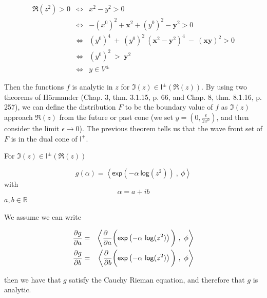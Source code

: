 \documentclass[10pt]{book}
\theoremstyle{break}
\begin{document}
\begin{eqnarray*}
\Re(z^2) > 0 &\Longleftrightarrow& x^2 - y^2 > 0 \\
&\Longleftrightarrow& -(x^0)^2 + \mathbf{x}^2 + (y^0)^2 - \mathbf{y}^2 > 0 \nonumber \\
&\Longleftrightarrow& (y^0)^4 \ + \ (y^0)^2 \ (\mathbf{x}^2-\mathbf{y}^2)^4 \ - \ \left(\mathbf{x}\mathbf{y}\right)^2 > 0 \nonumber \\
&\Longleftrightarrow& (y^0)^2 \ > \ \mathbf{y}^2 \nonumber \\
&\Longleftrightarrow& y \in V^{\pm}
\end{eqnarray*}

\noindent
Then the functions $f$ is analytic in $z$ for $\Im(z)\in \mathsf{I}^\pm\left(\Re(z)\right)$. By using two theorems of Hörmander (Chap. 3, thm. 3.1.15, p. 66, and Chap. 8, thm. 8.1.16, p. 257), we can define the distribution $F$ to be the boundary value of $f$ as $\Im(z)$ approach $\Re(z)$ from the future or past cone (we set $y=\left(0,\frac{\epsilon}{2 x^0}\right)$, and then consider the limit $\epsilon \to 0$). The previous theorem tells us that the wave front set of $F$ is in the dual cone of $\mathsf{I}^+$. 

\bigskip


For $\Im(z)\in \mathsf{I}^\pm\left(\Re(z)\right)$

\begin{equation*}
g(\alpha) = \left\langle \mathsf{exp}\left(-\alpha \ \mathsf{log}(z^2)\right) \ , \ \phi\right\rangle 
\end{equation*}
with 
\begin{equation*}
\alpha = a + i b 
\end{equation*}
$a, b \in \mathbb{R}$

\bigskip


We assume we can write 

\begin{eqnarray*}
\frac{\partial g}{\partial a} &=& \left\langle \frac{\partial \hfill}{\partial a} \bigg(\mathsf{exp}\left(-\alpha \ \mathsf{log}(z^2)\right)\bigg) \ , \ \phi\right\rangle  \\ 
\frac{\partial g}{\partial b} &=& \left\langle \frac{\partial \hfill}{\partial b} \bigg(\mathsf{exp}\left(-\alpha \ \mathsf{log}(z^2)\right)\bigg) \ , \ \phi\right\rangle 
\end{eqnarray*}


then we have that $g$ satisfy the Cauchy Rieman equation, and therefore that $g$ is analytic.
\end{document}

